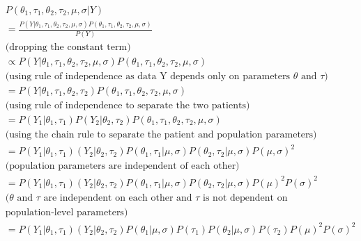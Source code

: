 \documentclass[12pt,a4paper,leqno]{report}
\theoremstyle{plain}
\theoremstyle{definition}
\theoremstyle{remark}
\begin{document}
\begin{equation*}\label{}
    \begin{aligned}\label{conjugatebayesrule}
        &P(\theta_1,\tau_1,\theta_2,\tau_2,\mu,\sigma | Y) \\
        &= \frac{P(Y | \theta_1,\tau_1,\theta_2,\tau_2,\mu,\sigma)P(\theta_1,\tau_1,\theta_2,\tau_2,\mu,\sigma)}{P(Y)} \\
        &\text{(dropping the constant term)} \\
        &\propto P(Y | \theta_1,\tau_1,\theta_2,\tau_2,\mu,\sigma)P(\theta_1,\tau_1,\theta_2,\tau_2,\mu,\sigma) \\
        &\text{(using rule of independence as data Y depends only on parameters $\theta$ and $\tau$)} \\
        &= P(Y | \theta_1,\tau_1,\theta_2,\tau_2)P(\theta_1,\tau_1,\theta_2,\tau_2,\mu,\sigma) \\
        &\text{(using rule of independence to separate the two patients)} \\
        &= P(Y_1 | \theta_1,\tau_1)P(Y_2 | \theta_2,\tau_2)P(\theta_1,\tau_1,\theta_2,\tau_2,\mu,\sigma) \\
        &\text{(using the chain rule to separate the patient and population parameters)} \\
        &= P(Y_1|\theta_1,\tau_1)(Y_2|\theta_2, \tau_2)P(\theta_1,\tau_1|\mu,\sigma)P(\theta_2,\tau_2|\mu,\sigma)P(\mu, \sigma)^2 \\
        &\text{(population parameters are independent of each other)} \nonumber \\
        &= P(Y_1|\theta_1,\tau_1)(Y_2|\theta_2, \tau_2)P(\theta_1,\tau_1|\mu,\sigma)P(\theta_2,\tau_2|\mu,\sigma)P(\mu)^2P(\sigma)^2 \\
        &\text{($\theta$ and $\tau$ are independent on each other and $\tau$ is not dependent on} \\
        & \text{population-level parameters)} \\
        &= P(Y_1|\theta_1,\tau_1)(Y_2|\theta_2, \tau_2)P(\theta_1|\mu,\sigma)P(\tau_1)P(\theta_2|\mu,\sigma)P(\tau_2)P(\mu)^2P(\sigma)^2 \nonumber
    \end{aligned}
\end{equation*}
\end{document}

